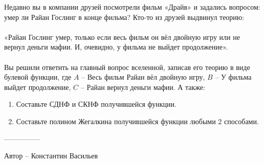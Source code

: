 \question
Недавно вы в компании друзей посмотрели фильм «Драйв» и задались вопросом: умер ли Райан Гослинг в конце фильма? Кто-то из друзей выдвинул теорию:
\\
\\
«Райан Гослинг умер, только если весь фильм он вёл двойную игру или не вернул деньги мафии. И, очевидно, у фильма не выйдет продолжение».
\\
\\
Вы решили ответить на главный вопрос вселенной, записав его теорию в виде булевой функции, где $A$ – Весь фильм Райан вёл двойную игру, $B$ – У фильма выйдет продолжение, $C$ – Райан вернул деньги мафии. А также:
\begin{enumerate}
    \item Составьте СДНФ и СКНФ получившейся функции.
    \item Составьте полином Жегалкина получившейся функции любыми 2 способами.
\end{enumerate}

---------------

Автор -- Константин Васильев